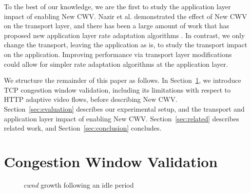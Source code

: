\documentclass[10pt,sigconf]{acmart}
\begin{document}
To the best of our knowledge, we are the first to study the application
layer impact of enabling New CWV. 
Nazir et al. \cite{Nazir-2014-performance-evaluation-congestion-window-validation-dash-newcwv}
demonstrated the effect of New CWV on the transport layer, and there has been a large amount of work that has proposed new application layer rate adaptation algorithms \cite{Mok-2012-qdash,Huang-2015-A-buffer-based-approach-to-rate-adaptation-bba, Yin-2015-a-control-theoritic-approach}. In contrast, we only change the transport, leaving the application as is, to study the transport impact on the application. Improving performance via transport layer modifications could allow for simpler rate adaptation algorithms at the application layer.


We structure the remainder of this paper as follows. In Section~\ref{sec:background}, we introduce TCP congestion window validation, including its limitations with respect to HTTP adaptive video flows, before describing New CWV. Section~\ref{sec:evaluation} describes our experimental setup, and the transport and application layer impact of enabling New CWV. Section~\ref{sec:related} describes related work, and Section~\ref{sec:conclusion} concludes.

\section{Congestion Window Validation}
\label{sec:background}

\begin{figure}
  \centering
    \caption{\emph{cwnd} growth following an idle period}
    \label{fig:cwnd-growth-after-idle}
\end{figure}
\end{document}
